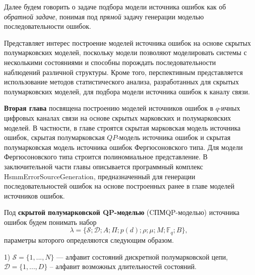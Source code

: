 \documentclass[twoside,12pt]{article}
\begin{document}
Далее будем говорить о задаче подбора модели источника ошибок как об \emph{обратной задаче}, понимая под \emph{прямой} задачу генерации моделью последовательности ошибок.


Представляет интерес построение моделей источника ошибок на основе скрытых полумарковских моделей, поскольку модели позволяют моделировать системы с несколькими состояниями и способны порождать последовательности наблюдений различной структуры. Кроме того, перспективным представляется использование методов статистического анализа, разработанных для скрытых полумарковских моделей, для подбора модели источника ошибок к каналу связи.

\textbf{Вторая глава} посвящена построению моделей источников ошибок в $q$-ичных цифровых каналах связи на основе скрытых марковских и полумарковских моделей. В частности, в главе строятся скрытая марковская модель источника ошибок, скрытая полумарковская $QP$-модель источника ошибок и скрытая полумарковская модель источника ошибок Фергюсоновского типа. Для модели Фергюсоновского типа строится полиномиальное представление. В заключительной части главы описывается программный комплекс HsmmErrorSourceGeneration, предназначенный для генерации последовательностей ошибок на основе построенных ранее в главе моделей источников ошибок.

Под \textbf{скрытой полумарковской QP-моделью} (CПМQP-моделью) источника ошибок будем понимать набор $$\lambda =  \{\mathcal{S};\mathcal{D}; A; \Pi; p(d); \rho; \mu ;M ;{\mathbb{F}}_q;B \},$$
параметры которого определяются следующим образом.

1) $\mathcal{S}=\{1,...,N\}$ --- алфавит состояний дискретной полумарковской цепи, $\mathcal{D}=\{1,...,D\}$ -- алфавит возможных длительностей состояний.
\end{document}
